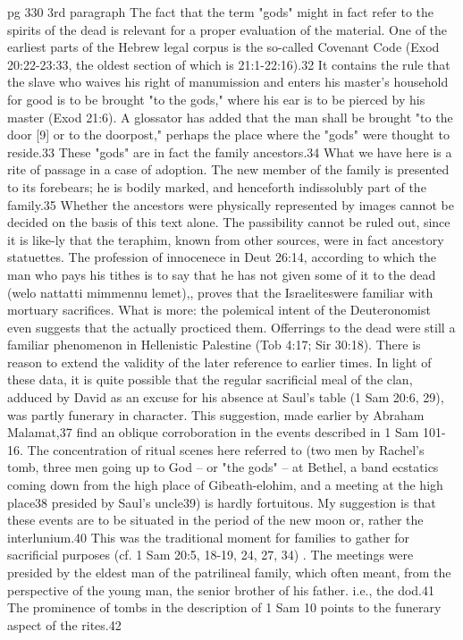 \documentclass[11pt]{article}
\begin{document}
{pg 330 3rd paragraph
The fact that the term "gods" might in fact refer to the spirits of the dead is relevant for a proper evaluation of the material. One of the earliest parts of the Hebrew legal corpus is the so-called Covenant Code (Exod 20:22-23:33, the oldest section of which is 21:1-22:16).32 It contains the rule that the slave who waives his right of manumission and enters his master's household for good is to be brought "to the gods," where his ear is to be pierced by his master (Exod 21:6). A glossator has added that the man shall be brought "to the door [9] or to the doorpost," perhaps the place where the "gods" were thought to reside.33 These "gods" are in fact the family ancestors.34 What we have here is a rite of passage in a case of adoption. The new member of the family is presented to its forebears; he is bodily marked, and henceforth indissolubly part of the family.35 Whether the ancestors were physically represented by images cannot be decided on the basis of this text alone. The passibility cannot be ruled out, since it is like-ly that the teraphim, known from other sources, were in fact ancestory statuettes. The profession of innocenece in Deut 26:14, according to which the man who pays his tithes is to say that he has not given some of it to the dead (welo nattatti mimmennu lemet),, proves that the Israeliteswere familiar with mortuary sacrifices. What is more: the polemical intent of the Deuteronomist even suggests that the actually procticed them. Offerrings to the dead were still a familiar phenomenon in Hellenistic Palestine (Tob 4:17; Sir 30:18). There is reason to extend the validity of the later reference to earlier times. 
In light of these data, it is quite possible that the regular sacrificial meal of the clan, adduced by David as an excuse for his absence at Saul's table (1 Sam 20:6, 29), was partly funerary in character. This suggestion, made earlier by Abraham Malamat,37 find an oblique corroboration in the events described in 1 Sam 101-16. The concentration of ritual scenes here referred to (two men by Rachel's tomb, three men going up to God -- or "the gods" -- at Bethel, a band ecstatics coming down from the high place of Gibeath-elohim, and a meeting at the high place38 presided by Saul's uncle39) is hardly fortuitous. My suggestion is that these events are to be situated in the period of the new moon or, rather the interlunium.40 This was the traditional moment for families to gather for sacrificial purposes (cf. 1 Sam 20:5, 18-19, 24, 27, 34) . The meetings were presided by the eldest man of the patrilineal family, which often meant, from the perspective of the young man, the senior brother of his father. i.e., the dod.41 The prominence of tombs in the description of 1 Sam 10 points to the funerary aspect of the rites.42

}
\end{document}
